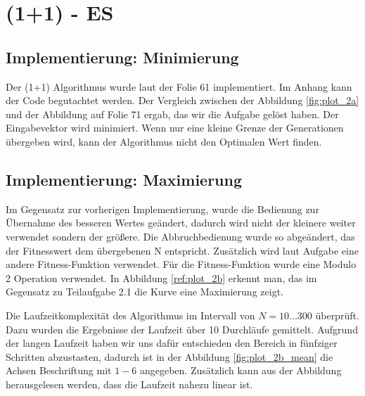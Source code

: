 \setcounter{chapter}{1}


\chapter{(1+1) - ES}

\section{Implementierung: Minimierung}

Der (1+1) Algorithmus wurde laut der Folie 61 implementiert. Im Anhang kann der Code begutachtet werden. Der Vergleich zwischen der Abbildung \ref{fig:plot_2a} und der Abbildung auf Folie 71 ergab, das wir die Aufgabe gelöst haben. Der Eingabevektor wird minimiert. Wenn nur eine kleine Grenze der Generationen übergeben wird, kann der Algorithmus nicht den Optimalen Wert finden.


\section{Implementierung: Maximierung}

Im Gegensatz zur vorherigen Implementierung, wurde die Bedienung zur Übernahme des besseren Wertes geändert, dadurch wird nicht der kleinere weiter verwendet sondern der größere. Die Abbruchbedienung wurde so abgeändert, das der Fitnesswert dem übergebenen N entspricht. Zusätzlich wird laut Aufgabe eine andere Fitness-Funktion verwendet. Für die Fitness-Funktion wurde eine Modulo 2 Operation verwendet. In Abbildung \ref{ref:plot_2b} erkennt man, das im Gegensatz zu Teilaufgabe 2.1 die Kurve eine Maximierung zeigt.


\newpage

Die Laufzeitkomplexität des Algorithmus im Intervall von $N=10 ... 300$ überprüft. Dazu wurden die Ergebnisse der Laufzeit über 10 Durchläufe gemittelt. Aufgrund der langen Laufzeit haben wir uns dafür entschieden den Bereich in fünfziger Schritten abzustasten, dadurch ist in der Abbildung \ref{fig:plot_2b_mean} die Achsen Beschriftung mit $1-6$ angegeben. Zusätzlich kann aus der Abbildung herausgelesen werden, dass die Laufzeit nahezu linear ist.


